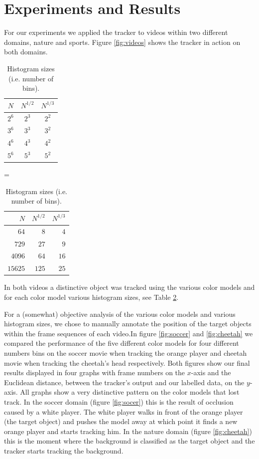 \documentclass[11pt]{article}
\begin{document}
\section{Experiments and Results} \label{sec:results}
For our experiments we applied the tracker to videos within two different
domains, nature and sports. Figure \ref{fig:videos} shows the tracker in action
on both domains. 
\begin{table}
\centering
\begin{tabular}{c|c|c}
$N$   & $N^{1/2}$ & $N^{1/3}$\\\hline\hline
$2^6$ & $2^3$     & $2^2$\\\hline
$3^6$ & $3^3$     & $3^2$\\\hline
$4^6$ & $4^3$     & $4^2$\\\hline
$5^6$ & $5^3$     & $5^2$\\
\end{tabular}
=
\begin{tabular}{r|r|r}
$N$     & $N^{1/2}$ & $N^{1/3}$\\\hline\hline
$64$    & $8$       & $4$\\\hline
$729$   & $27$      & $9$\\\hline
$4096$  & $64$      & $16$\\\hline
$15625$ & $125$     & $25$\\
\end{tabular}
\caption{Histogram sizes (i.e. number of bins).}
\label{tbl:bins}
\end{table}
In both videos a distinctive object was tracked using the various color models
and for each color model various histogram sizes, see Table \ref{tbl:bins}.

For a (somewhat) objective analysis of the various color models and various
histogram sizes, we chose to manually annotate the position of the target
objects within the frame sequences of each video.In figure \ref{fig:soccer}
and \ref{fig:cheetah} we compared the performance of
the five different color models for four different numbers bins on the soccer
movie when tracking the orange player and cheetah movie when tracking the
cheetah's head respectively. Both figures show our final results displayed in
four graphs with frame numbers on the $x$-axis and the Euclidean distance,
between the tracker's output and our labelled data, on the $y$-axis. All graphs
show a very distinctive pattern on the color models that lost track. In the
soccer domain (figure \ref{fig:socer}) this is the result of occlusion caused by
a white player. The white player walks in front of the orange player (the
target object) and pushes the model away at which point it finds a new orange
player and starts tracking him. In the nature domain (figure \ref{fig:cheetah})
this is the moment where the background is classified as the target object and
the tracker starts tracking the background.
\end{document}
